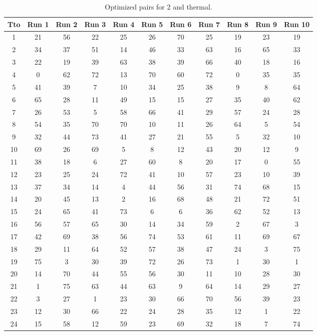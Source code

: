 \begin{table}
  \centering
  \scriptsize
  \caption{Optimized pairs for 2 and thermal.}
  \label{tab_pairs}
\begin{tabular}{c c c c c c c c c c c }
\hline
Tto & Run 1 & Run 2 & Run 3 & Run 4 & Run 5 & Run 6 & Run 7 & Run 8 & Run 9 & Run 10 \\
\hline
1 & 21 & 56 & 22 & 25 & 26 & 70 & 25 & 19 & 23 & 19 \\
2 & 34 & 37 & 51 & 14 & 46 & 33 & 63 & 16 & 65 & 33 \\
3 & 22 & 19 & 39 & 63 & 38 & 39 & 66 & 40 & 18 & 16 \\
4 & 0 & 62 & 72 & 13 & 70 & 60 & 72 & 0 & 35 & 35 \\
5 & 41 & 39 & 7 & 10 & 34 & 25 & 38 & 9 & 8 & 64 \\
6 & 65 & 28 & 11 & 49 & 15 & 15 & 27 & 35 & 40 & 62 \\
7 & 26 & 53 & 5 & 58 & 66 & 41 & 29 & 57 & 24 & 28 \\
8 & 54 & 35 & 70 & 70 & 10 & 11 & 26 & 64 & 5 & 54 \\
9 & 32 & 44 & 73 & 41 & 27 & 21 & 55 & 5 & 32 & 10 \\
10 & 69 & 26 & 69 & 5 & 8 & 12 & 43 & 20 & 12 & 9 \\
11 & 38 & 18 & 6 & 27 & 60 & 8 & 20 & 17 & 0 & 55 \\
12 & 23 & 25 & 24 & 72 & 41 & 10 & 57 & 23 & 10 & 39 \\
13 & 37 & 34 & 14 & 4 & 44 & 56 & 31 & 74 & 68 & 15 \\
14 & 20 & 45 & 13 & 2 & 16 & 68 & 48 & 21 & 72 & 51 \\
15 & 24 & 65 & 41 & 73 & 6 & 6 & 36 & 62 & 52 & 13 \\
16 & 56 & 57 & 65 & 30 & 14 & 34 & 59 & 2 & 67 & 3 \\
17 & 42 & 69 & 38 & 56 & 74 & 53 & 61 & 11 & 69 & 67 \\
18 & 29 & 11 & 64 & 52 & 57 & 38 & 47 & 24 & 3 & 75 \\
19 & 75 & 3 & 30 & 39 & 72 & 26 & 73 & 1 & 30 & 1 \\
20 & 14 & 70 & 44 & 55 & 56 & 30 & 11 & 10 & 28 & 30 \\
21 & 1 & 75 & 63 & 44 & 63 & 9 & 64 & 14 & 29 & 27 \\
22 & 3 & 27 & 1 & 23 & 30 & 66 & 70 & 56 & 39 & 23 \\
23 & 12 & 30 & 66 & 22 & 24 & 28 & 35 & 12 & 1 & 22 \\
24 & 15 & 58 & 12 & 59 & 23 & 69 & 32 & 18 & 7 & 74 \\

\end{tabular}
\end{table}
